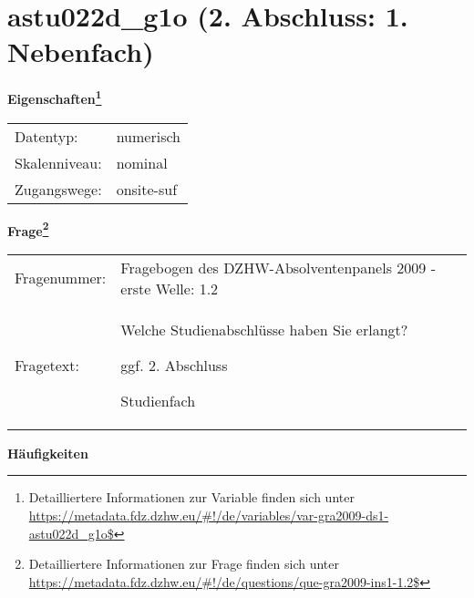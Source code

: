 
    \setcounter{footnote}{0}

    \vspace*{-1.8cm}
	\section{astu022d\_g1o (2. Abschluss: 1. Nebenfach)}
	\label{section:astu022d_g1o}



    \vspace*{0.5cm}
    \noindent\textbf{Eigenschaften\footnote{Detailliertere Informationen zur Variable finden sich unter
		\url{https://metadata.fdz.dzhw.eu/\#!/de/variables/var-gra2009-ds1-astu022d_g1o$}}}\\
	\begin{tabularx}{\hsize}{@{}lX}
	Datentyp: & numerisch \\
	Skalenniveau: & nominal \\
	Zugangswege: &
	  onsite-suf
 \\
    \end{tabularx}



				\vspace*{0.5cm}
                \noindent\textbf{Frage\footnote{Detailliertere Informationen zur Frage finden sich unter
		              \url{https://metadata.fdz.dzhw.eu/\#!/de/questions/que-gra2009-ins1-1.2$}}}\\
				\begin{tabularx}{\hsize}{@{}lX}
					Fragenummer: &
					  Fragebogen des DZHW-Absolventenpanels 2009 - erste Welle:
					  1.2
 \\
					Fragetext: & Welche Studienabschlüsse haben Sie erlangt?\par  ggf. 2. Abschluss\par  Studienfach \\
				\end{tabularx}





        		\vspace*{0.5cm}
                \noindent\textbf{Häufigkeiten}


